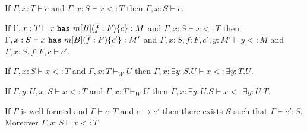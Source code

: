 \begin{lem}\label{suc}
If $\Gamma,x:T\vdash c$ and $\Gamma,x:S\vdash x<:T$ then $\Gamma,x:S\vdash c$.
\end{lem}

\begin{lem}\label{sum}
	If $\Gamma,x:T\vdash x~{\tt has}~m[\overline{B}](\overline{f}:\overline{F})\{c\}:M$ and $\Gamma,x:S\vdash x<:T$ then $\Gamma,x:S\vdash x~{\tt has}~m[\overline{B}](\overline{f}:\overline{F})\{c'\}:M'$ and $\Gamma,x:S,\overline{f}:\overline{F},c',y:M'\vdash y<:M$ and $\Gamma,x:S,\overline{f}:\overline{F},c\vdash c'$.
	\end{lem}

\begin{lem}\label{sue}
If $\Gamma,x:S\vdash x<:T$ and $\Gamma,x:T\vdash_W U$ then $\Gamma, x:\exists y:S.U\vdash x<:\exists y:T.U$.
\end{lem}

\begin{lem}\label{sud}
If $\Gamma,y:U,x:S\vdash x<:T$ and $\Gamma,x:T\vdash_W U$ then $\Gamma, x:\exists y:U.S\vdash x<:\exists y:U.T$.
\end{lem}


\begin{thm}\label{sr}
If $\Gamma$ is well formed and $\Gamma\vdash e:T$ and $e\rightarrow e'$ then there exists $S$ such that $\Gamma\vdash e':S$. Moreover $\Gamma,x:S\vdash x<:T$.
\end{thm}


